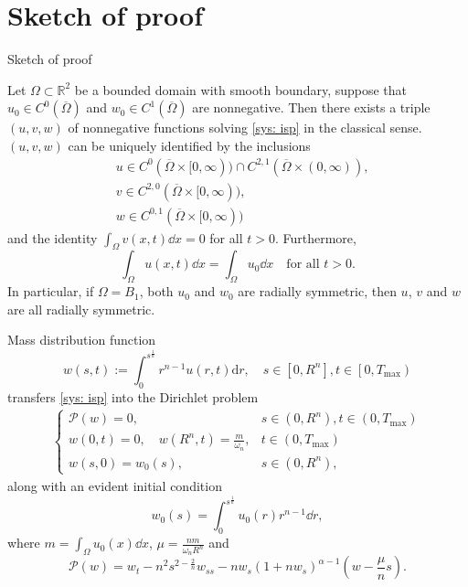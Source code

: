 \section{Sketch of proof}
\begin{frame}{Sketch of proof}

\begin{lemma}
\label{le: global existence and uniqueness}
	Let $\Omega\subset\mathbb{R}^2$ be a bounded domain with smooth boundary, suppose that $u_0\in C^0(\overline{\Omega})$ and $w_0\in C^1(\overline{\Omega})$ are nonnegative.
    Then there exists a triple $(u, v, w)$ of nonnegative functions solving \eqref{sys: isp} in the classical sense. $(u, v, w)$ can be uniquely identified by the inclusions		
	\begin{align*}
	& u \in C^0(\overline{\Omega} \times[0, \infty)) \cap C^{2,1}(\overline{\Omega} \times(0, \infty)), \\
	& v \in C^{2,0}(\overline{\Omega} \times[0, \infty)), \\
	& w \in C^{0,1}(\overline{\Omega} \times[0, \infty))
	\end{align*}
and the identity
\(\int_{\Omega} v(x, t)\dd x=0\) for all  \(t > 0\).
Furthermore,
\begin{equation*}
	\int_{\Omega} u(x, t) \dd {x}=\int_{\Omega} u_{0} \dd x
    \quad\text{for all } t > 0.
\end{equation*}
In particular, if $\Omega = B_1$, both $u_0$ and $w_0$ are radially symmetric, then $u$, $v$ and $w$ are all radially symmetric.
\end{lemma}
\end{frame}

\begin{frame}{Mass distribution function}
\begin{equation}\label{partial mass substitution}
	w(s, t):=\int_{0}^{s^{\frac{1}{n}}} r^{n-1} u(r, t) \mathrm{d} r, \quad s \in\left[0, R^{n}\right], t \in\left[0, T_{\max }\right)
\end{equation}
transfers \eqref{sys: isp}  into the Dirichlet problem
\begin{align}\label{partial mass pde}
    \begin{cases}
		\mathcal{P}(w) = 0, & s \in(0, R^{n}), t \in\left(0, T_{\max }\right)\\
		w(0, t)=0, \quad w\left(R^{n}, t\right)=\frac{m}{\omega_{n}}, & t \in\left(0, T_{\max }\right)\\
		w(s, 0) = w_0(s), & s\in(0, R^n), 
    \end{cases}
\end{align}
along with an evident initial condition
\begin{equation}\label{partial mass initial data}
	w_0(s) = \int_0^{s^\frac{1}{n}}u_0(r)r^{n-1}\dd r,
\end{equation}
where $m = \int_\Omega u_0(x)\dd x$, $\mu = \frac{nm}{\omega_nR^n}$ and
\[
\mathcal{P}(w) = w_{t} - n^{2} s^{2-\frac{2}{n}} w_{s s} - nw_{s}(1 + nw_s)^{\alpha -1} (w-\frac\mu n s).  
\]
\end{frame}

